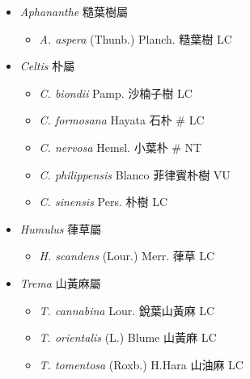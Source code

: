 
  \begin{itemize}
 \item[] \textit{Aphananthe} 糙葉樹屬
                                
  \begin{itemize}
        \item[] \textit{A. aspera} (Thunb.) Planch.  糙葉樹   LC
  \end{itemize}
 \item[] \textit{Celtis} 朴屬
                                
  \begin{itemize}
        \item[] \textit{C. biondii} Pamp.  沙楠子樹   LC
        \item[] \textit{C. formosana} Hayata  石朴  \# LC
        \item[] \textit{C. nervosa} Hemsl.  小葉朴  \# NT
        \item[] \textit{C. philippensis} Blanco  菲律賓朴樹   VU
        \item[] \textit{C. sinensis} Pers.  朴樹   LC
  \end{itemize}
 \item[] \textit{Humulus} 葎草屬
                                
  \begin{itemize}
        \item[] \textit{H. scandens} (Lour.) Merr.  葎草   LC
  \end{itemize}
 \item[] \textit{Trema} 山黃麻屬
                                
  \begin{itemize}
        \item[] \textit{T. cannabina} Lour.  銳葉山黃麻   LC
        \item[] \textit{T. orientalis} (L.) Blume  山黃麻   LC
        \item[] \textit{T. tomentosa} (Roxb.) H.Hara  山油麻   LC
  \end{itemize}
  \end{itemize}
